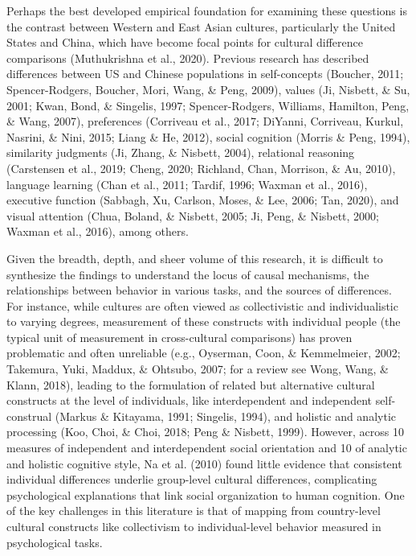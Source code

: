 \documentclass[10pt, letterpaper]{article}
\begin{document}
Perhaps the best developed empirical foundation for examining these
questions is the contrast between Western and East Asian cultures,
particularly the United States and China, which have become focal points
for cultural difference comparisons (Muthukrishna et al., 2020).
Previous research has described differences between US and Chinese
populations in self-concepts (Boucher, 2011; Spencer-Rodgers, Boucher,
Mori, Wang, \& Peng, 2009), values (Ji, Nisbett, \& Su, 2001; Kwan,
Bond, \& Singelis, 1997; Spencer-Rodgers, Williams, Hamilton, Peng, \&
Wang, 2007), preferences (Corriveau et al., 2017; DiYanni, Corriveau,
Kurkul, Nasrini, \& Nini, 2015; Liang \& He, 2012), social cognition
(Morris \& Peng, 1994), similarity judgments (Ji, Zhang, \& Nisbett,
2004), relational reasoning (Carstensen et al., 2019; Cheng, 2020;
Richland, Chan, Morrison, \& Au, 2010), language learning (Chan et al.,
2011; Tardif, 1996; Waxman et al., 2016), executive function (Sabbagh,
Xu, Carlson, Moses, \& Lee, 2006; Tan, 2020), and visual attention
(Chua, Boland, \& Nisbett, 2005; Ji, Peng, \& Nisbett, 2000; Waxman et
al., 2016), among others.

Given the breadth, depth, and sheer volume of this research, it is
difficult to synthesize the findings to understand the locus of causal
mechanisms, the relationships between behavior in various tasks, and the
sources of differences. For instance, while cultures are often viewed as
collectivistic and individualistic to varying degrees, measurement of
these constructs with individual people (the typical unit of measurement
in cross-cultural comparisons) has proven problematic and often
unreliable (e.g., Oyserman, Coon, \& Kemmelmeier, 2002; Takemura, Yuki,
Maddux, \& Ohtsubo, 2007; for a review see Wong, Wang, \& Klann, 2018),
leading to the formulation of related but alternative cultural
constructs at the level of individuals, like interdependent and
independent self-construal (Markus \& Kitayama, 1991; Singelis, 1994),
and holistic and analytic processing (Koo, Choi, \& Choi, 2018; Peng \&
Nisbett, 1999). However, across 10 measures of independent and
interdependent social orientation and 10 of analytic and holistic
cognitive style, Na et al. (2010) found little evidence that consistent
individual differences underlie group-level cultural differences,
complicating psychological explanations that link social organization to
human cognition. One of the key challenges in this literature is that of
mapping from country-level cultural constructs like collectivism to
individual-level behavior measured in psychological tasks.
\end{document}
